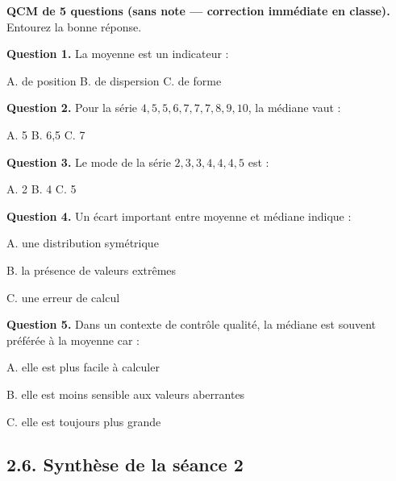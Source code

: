 \documentclass[11pt,a4paper]{article}
\begin{document}
\begin{questionbox}
\textbf{QCM de 5 questions (sans note — correction immédiate en classe).} Entourez la bonne réponse.

\vspace{0.3cm}
\textbf{Question 1.} La moyenne est un indicateur :

\hspace{1cm} A. de position \hspace{2cm} B. de dispersion \hspace{2cm} C. de forme

\vspace{0.3cm}
\textbf{Question 2.} Pour la série $4, 5, 5, 6, 7, 7, 7, 8, 9, 10$, la médiane vaut :

\hspace{1cm} A. 5 \hspace{2.5cm} B. 6{,}5 \hspace{2.5cm} C. 7

\vspace{0.3cm}
\textbf{Question 3.} Le mode de la série $2, 3, 3, 4, 4, 4, 5$ est :

\hspace{1cm} A. 2 \hspace{2.5cm} B. 4 \hspace{2.5cm} C. 5

\vspace{0.3cm}
\textbf{Question 4.} Un écart important entre moyenne et médiane indique :

\hspace{1cm} A. une distribution symétrique

\hspace{1cm} B. la présence de valeurs extrêmes

\hspace{1cm} C. une erreur de calcul

\vspace{0.3cm}
\textbf{Question 5.} Dans un contexte de contrôle qualité, la médiane est souvent préférée à la moyenne car :

\hspace{1cm} A. elle est plus facile à calculer

\hspace{1cm} B. elle est moins sensible aux valeurs aberrantes

\hspace{1cm} C. elle est toujours plus grande
\end{questionbox}

\subsection*{2.6. Synthèse de la séance 2}
\end{document}
